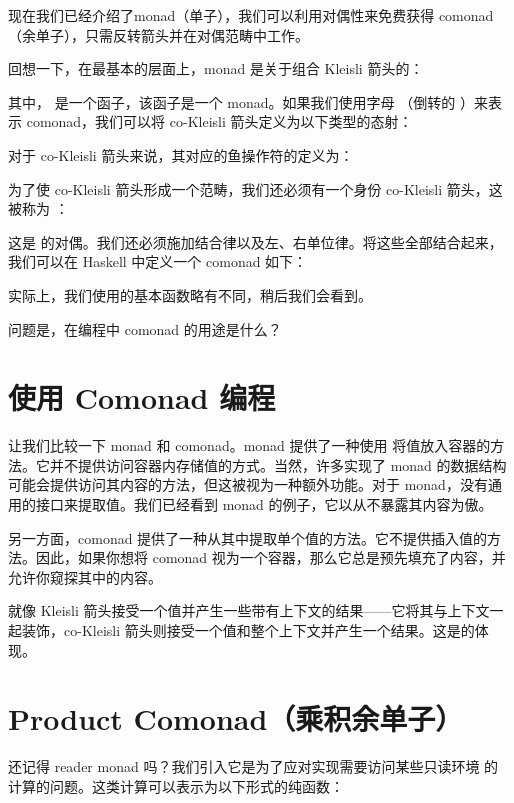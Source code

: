 
\lettrine[lhang=0.17]{现}{在我们已经介绍了}monad（单子），我们可以利用对偶性来免费获得 comonad（余单子），只需反转箭头并在对偶范畴中工作。

回想一下，在最基本的层面上，monad 是关于组合 Kleisli 箭头的：

其中， 是一个函子，该函子是一个 monad。如果我们使用字母 （倒转的 ）来表示 comonad，我们可以将 co-Kleisli 箭头定义为以下类型的态射：

对于 co-Kleisli 箭头来说，其对应的鱼操作符的定义为：

为了使 co-Kleisli 箭头形成一个范畴，我们还必须有一个身份 co-Kleisli 箭头，这被称为 ：

这是  的对偶。我们还必须施加结合律以及左、右单位律。将这些全部结合起来，我们可以在 Haskell 中定义一个 comonad 如下：

实际上，我们使用的基本函数略有不同，稍后我们会看到。

问题是，在编程中 comonad 的用途是什么？

\section{使用 Comonad 编程}

让我们比较一下 monad 和 comonad。monad 提供了一种使用  将值放入容器的方法。它并不提供访问容器内存储值的方式。当然，许多实现了 monad 的数据结构可能会提供访问其内容的方法，但这被视为一种额外功能。对于 monad，没有通用的接口来提取值。我们已经看到  monad 的例子，它以从不暴露其内容为傲。

另一方面，comonad 提供了一种从其中提取单个值的方法。它不提供插入值的方法。因此，如果你想将 comonad 视为一个容器，那么它总是预先填充了内容，并允许你窥探其中的内容。

就像 Kleisli 箭头接受一个值并产生一些带有上下文的结果——它将其与上下文一起装饰，co-Kleisli 箭头则接受一个值和整个上下文并产生一个结果。这是的体现。

\section{Product Comonad（乘积余单子）}

还记得 reader monad 吗？我们引入它是为了应对实现需要访问某些只读环境  的计算的问题。这类计算可以表示为以下形式的纯函数：

